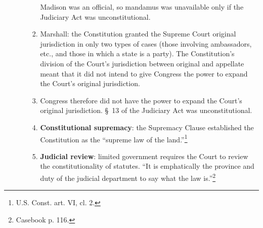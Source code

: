 \begin{enumerate}
\begin{enumerate}
\begin{enumerate}
            Madison was an official, so mandamus was unavailable only if the 
            Judiciary Act was unconstitutional.
            \item Marshall: the Constitution granted the Supreme Court 
            original jurisdiction in only two types of cases (those involving 
            ambassadors, etc., and those in which a state is a party). The 
            Constitution's division of the Court's jurisdiction between 
            original and appellate meant that it did not intend to give 
            Congress the power to expand the Court's original jurisdiction.
            \item Congress therefore did not have the power to expand the 
            Court's original jurisdiction. \S\ 13 of the Judiciary Act was 
            unconstitutional.
            \item \textbf{Constitutional supremacy}: the Supremacy Clause 
            established the Constitution as the ``supreme law of the 
            land.''\footnote{U.S. Const. art. VI, cl. 2.}
            \item \textbf{Judicial review}: limited government requires the 
            Court to review the constitutionality of statutes. ``It is 
            emphatically the province and duty of the judicial department to 
            say what the law is.''\footnote{Casebook p. 116.}
        \end{enumerate}
    \end{enumerate}
\end{enumerate}

